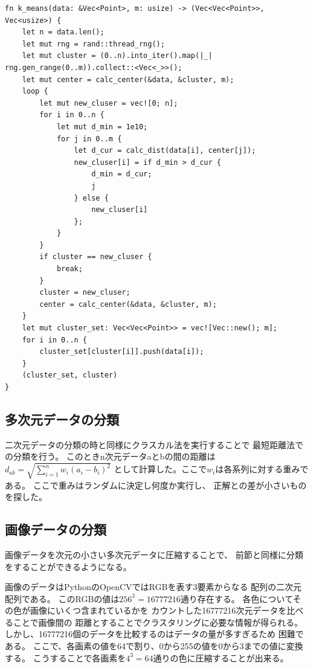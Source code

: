\documentclass[dvipdfmx]{jsarticle}
\begin{document}
\begin{lstlisting}[caption=k-means法の実装,label=code:kmeans]
fn k_means(data: &Vec<Point>, m: usize) -> (Vec<Vec<Point>>, Vec<usize>) {
    let n = data.len();
    let mut rng = rand::thread_rng();
    let mut cluster = (0..n).into_iter().map(|_| rng.gen_range(0..m)).collect::<Vec<_>>();
    let mut center = calc_center(&data, &cluster, m);
    loop {
        let mut new_cluser = vec![0; n];
        for i in 0..n {
            let mut d_min = 1e10;
            for j in 0..m {
                let d_cur = calc_dist(data[i], center[j]);
                new_cluser[i] = if d_min > d_cur {
                    d_min = d_cur;
                    j
                } else {
                    new_cluser[i]
                };
            }
        }
        if cluster == new_cluser {
            break;
        }
        cluster = new_cluser;
        center = calc_center(&data, &cluster, m);
    }
    let mut cluster_set: Vec<Vec<Point>> = vec![Vec::new(); m];
    for i in 0..n {
        cluster_set[cluster[i]].push(data[i]);
    }
    (cluster_set, cluster)
}
\end{lstlisting}


\subsection{多次元データの分類}

二次元データの分類の時と同様にクラスカル法を実行することで
最短距離法での分類を行う。
このときn次元データaとbの間の距離は
$\displaystyle d_{ab} = \sqrt{ \sum_{i=1}^{n}w_i(a_i - b_i)^2 }$
として計算した。ここで$w_i$は各系列に対する重みである。
ここで重みはランダムに決定し何度か実行し、
正解との差が小さいものを探した。


\subsection{画像データの分類}

画像データを次元の小さい多次元データに圧縮することで、
前節と同様に分類をすることができるようになる。

画像のデータはPythonのOpenCVではRGBを表す3要素からなる
配列の二次元配列である。
このRGBの値は$256^3=16777216$通り存在する。
各色についてその色が画像にいくつ含まれているかを
カウントした16777216次元データを比べることで画像間の
距離とすることでクラスタリングに必要な情報が得られる。
しかし、16777216個のデータを比較するのはデータの量が多すぎるため
困難である。
ここで、各画素の値を64で割り、0から255の値を0から3までの値に変換する。
こうすることで各画素を$4^3=64$通りの色に圧縮することが出来る。
\end{document}
